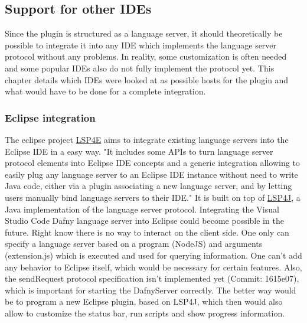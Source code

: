 \subsection{Support for other IDEs} \label{ides}
Since the plugin is structured as a language server, it should theoretically be possible to integrate it into any IDE which implements the language server protocol without any problems. In reality, some customization is often needed and some popular IDEs also do not fully implement the protocol yet. This chapter details which IDEs were looked at as possible hosts for the plugin and what would have to be done for a complete integration.
\subsubsection{Eclipse integration}
The eclipse project \href{https://projects.eclipse.org/projects/technology.lsp4e}{LSP4E} aims to integrate existing language servers into the Eclipse IDE in a easy way. 
\newline
"It includes some APIs to turn language server protocol elements into Eclipse IDE concepts and a generic integration allowing to easily plug any language server to an Eclipse IDE instance without need to write Java code, either via a plugin associating a new language server, and by letting users manually bind language servers to their IDE." \cite{lsp4e}
It is built on top of \href{https://github.com/eclipse/lsp4j}{LSP4J}, a Java implementation of the language server protocol. 
\newline
Integrating the Visual Studio Code Dafny language server into Eclipse could become possible in the future. Right know there is no way to interact on the client side. One only can specify a language server based on a program (NodeJS) and arguments (extension.js) which is executed and used for querying information. One can't add any behavior to Eclipse itself, which would be necessary for certain features. Also, the sendRequest protocol specification isn't implemented yet (Commit: 1615e07), which is important for starting the DafnyServer correctly. 
The better way would be to program a new Eclipse plugin, based on LSP4J, which then would also allow to customize the status bar, run scripts and show progress information. 
